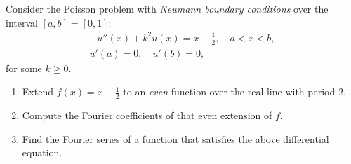 \documentclass[11pt]{article}
\begin{document}
\begin{exercise}
    Consider the Poisson problem with \textit{Neumann boundary conditions} over the interval $[a,b] = [0,1]$: 
    \begin{gather*}
        - u''(x) + k^2 u(x) = x - \frac 1 2, \quad a < x < b,
        \\
        u'(a) = 0, \quad u'(b) = 0,
    \end{gather*}
    for some $k \geq 0$.
    \begin{enumerate}[label=(\alph*)]
        \item
        Extend $f(x) = x - \frac 1 2$ to an \textit{even} function over the real line with period $2$.
        \item 
        Compute the Fourier coefficients of that even extension of $f$.
        \item 
        Find the Fourier series of a function that satisfies the above differential equation.
    \end{enumerate}
\end{exercise}
\end{document}
